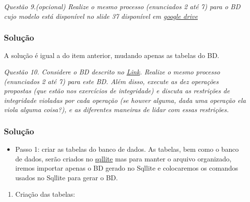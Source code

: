 \documentclass[
]{article}
\providecommand{\tightlist}{%
  \setlength{\itemsep}{0pt}\setlength{\parskip}{0pt}}
\begin{document}
\emph{Questão 9.(opcional) Realize o mesmo processo (enunciados 2 até 7)
para o BD cujo modelo está disponível no slide 37 disponível em
\href{https://drive.google.com/file/d/1DcMGlIaxX4qhcYUZtfwrpOM5A3tm4_mr/view?usp=drive_link}{google
drive}}

\subsubsection{Solução}\label{soluuxe7uxe3o-8}

A solução é igual a do item anterior, mudando apenas as tabelas do BD.

\emph{Questão 10. Considere o BD descrito no
\href{https://docs.google.com/document/d/1aeXm28RG-LOCD8nKd9ivhtImiTymc5mU1a_PFHvs19Y/edit}{Link}.
Realize o mesmo processo (enunciados 2 até 7) para este BD. Além disso,
execute as dez operações propostas (que estão nos exercícios de
integridade) e discuta as restrições de integridade violadas por cada
operação (se houver alguma, dada uma operação ela viola alguma coisa?),
e as diferentes maneiras de lidar com essas restrições.}

\subsubsection{Solução}\label{soluuxe7uxe3o-9}

\begin{itemize}
\tightlist
\item
  Passo 1: criar as tabelas do banco de dados. As tabelas, bem como o
  banco de dados, serão criados no
  \href{https://sqliteonline.com/}{sqllite} mas para manter o arquivo
  organizado, iremos importar apenas o BD gerado no Sqllite e
  colocaremos os comandos usados no Sqllite para gerar o BD.
\end{itemize}

\begin{enumerate}
\def\labelenumi{\arabic{enumi}.}
\tightlist
\item
  Criação das tabelas:
\end{enumerate}
\end{document}
